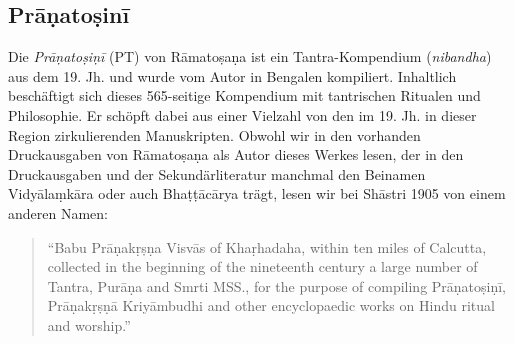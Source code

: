 \documentclass[a4paper,12pt]{article}
\begin{document}
\clearpage
\subsection{Prāṇatoṣinī}

Die \textit{Prāṇatoṣiṇī} (PT) von Rāmatoṣaṇa ist ein Tantra-Kompendium (\textit{nibandha}) aus dem 19. Jh. und wurde vom Autor in Bengalen kompiliert. Inhaltlich beschäftigt sich dieses 565-seitige Kompendium mit tantrischen Ritualen und Philosophie. Er schöpft dabei aus einer Vielzahl von den im 19. Jh. in dieser Region zirkulierenden Manuskripten. Obwohl wir in den vorhanden Druckausgaben von Rāmatoṣaṇa als Autor dieses Werkes lesen, der in den Druckausgaben und der Sekundärliteratur manchmal den Beinamen Vidyālaṃkāra oder auch Bhaṭṭācārya trägt, lesen wir bei Shāstri 1905 von einem anderen Namen:

\begin{quote}
``Babu Prāṇakṛṣṇa Visvās of Khaṛhadaha, within ten miles of Calcutta, collected in the beginning of the nineteenth century a large number
of Tantra, Purāṇa and Smrti MSS., for the purpose of compiling Prāṇatoṣiṇī, Prāṇakṛṣṇā Kriyāmbudhi and other encyclopaedic works on Hindu ritual and worship.'' \parencite[2]{shastri1905}
\end{quote}
\end{document}
